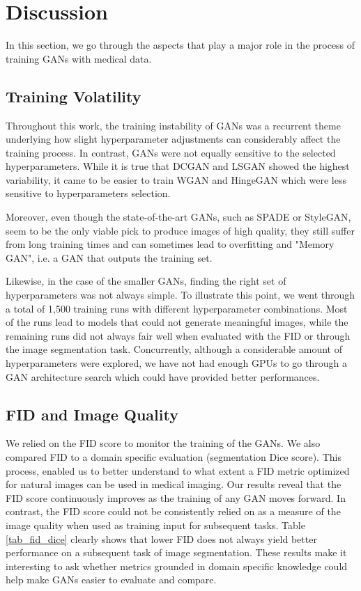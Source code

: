 \documentclass[preprint,12pt, authoryear]{elsarticle}
\begin{document}
\section{Discussion}
\label{sec:discussion}
In this section, we go through the aspects that play a major role in the process of training GANs with medical data.

\subsection{Training Volatility}
Throughout this work, the training instability of GANs was a recurrent theme underlying how slight hyperparameter adjustments can considerably affect the training process. In contrast, GANs were not equally sensitive to the selected hyperparameters. While it is true that DCGAN and LSGAN showed the highest variability, it came to be easier to train WGAN and HingeGAN which were less sensitive to hyperparameters selection.

Moreover, even though the state-of-the-art GANs, such as SPADE or StyleGAN, seem to be the only viable pick to produce images of high quality, they still suffer from long training times and can sometimes lead to overfitting and "Memory GAN", i.e. a GAN that outputs the training set. 

Likewise, in the case of the smaller GANs, finding the right set of hyperparameters was not always simple. To illustrate this point, we went through a total of 1,500 training runs with different hyperparameter combinations. Most of the runs lead to models that could not generate meaningful images, while the remaining runs did not always fair well when evaluated with the FID or through the image segmentation task.
Concurrently, although a considerable amount of hyperparameters were explored, we have not had enough GPUs to go through a GAN architecture search which could have provided better performances.

\subsection{FID and Image Quality}
We relied on the FID score to monitor the training of the GANs. We also compared FID to a domain specific evaluation (segmentation Dice score). This process, enabled us to better understand to what extent a FID metric optimized for natural images can be used in medical imaging. Our results reveal that the FID score continuously improves as the training of any GAN moves forward.  In contrast, the FID score could not be consistently relied on as a measure of the image quality when used as training input for subsequent tasks. Table \ref{tab_fid_dice} clearly shows that lower FID does not always yield better performance on a subsequent task of image segmentation.
These results make it interesting to ask whether metrics grounded in domain specific knowledge could help make GANs easier to evaluate and compare.
\end{document}
